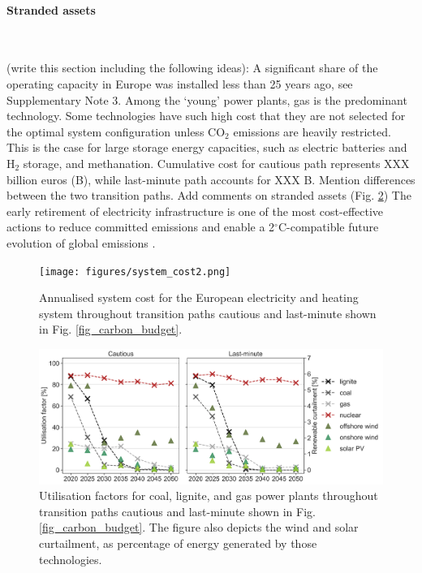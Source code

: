 \documentclass[5p]{elsarticle} %
\begin{document}
\paragraph{\textbf{Stranded assets}} \

(write this section including the following ideas): A significant share of the operating capacity in Europe was installed less than 25 years ago, see Supplementary Note 3. Among the `young' power plants, gas is the predominant technology.
Some technologies have such high cost that they are not selected for the optimal system configuration unless CO$_2$ emissions are heavily restricted. This is the case for large storage energy capacities, such as electric batteries and H$_2$ storage, and methanation. Cumulative cost for cautious path represents XXX billion euros (B\EUR), while last-minute path accounts for XXX B\EUR. Mention differences between the two transition paths. Add comments on stranded assets (Fig. \ref{fig_utilisation_factors})
The early retirement of electricity infrastructure is one of the most cost-effective actions to reduce committed emissions and enable a 2$^{\circ}$C-compatible future evolution of global emissions \cite{Tong_2019}.

\begin{figure}[!h]
\centering
\texttt{[image: figures/system\_cost2.png]}
\caption{Annualised system cost for the European electricity and heating system throughout transition paths cautious and last-minute shown in Fig. \ref{fig_carbon_budget}.} \label{fig_system_cost} 
\end{figure}

\begin{figure}[!h]
\centering
\includegraphics[width=\columnwidth]{figures/utilisation_factors.png}
\caption{Utilisation factors for coal, lignite, and gas power plants throughout transition paths cautious and last-minute shown in Fig. \ref{fig_carbon_budget}. The figure also depicts the wind and solar curtailment, as percentage of energy generated by those technologies. } \label{fig_utilisation_factors} 
\end{figure}
\end{document}
